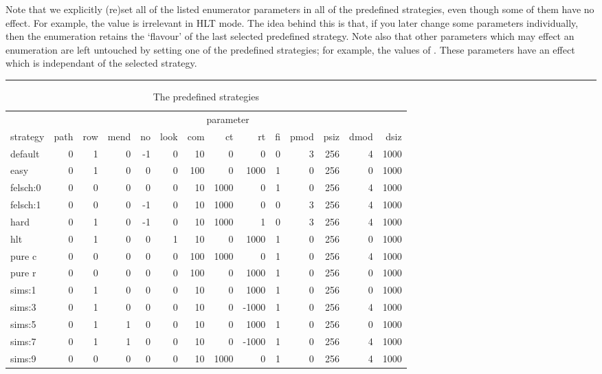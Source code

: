 Note that we explicitly (re)set all of the listed enumerator parameters in
  all of the predefined strategies, even though some of them have no
  effect.
For example, the  value is irrelevant in HLT mode.
The idea behind this is that, if you later change some parameters
  individually, then the enumeration retains the `flavour' of the last
  selected predefined strategy.
Note also that other parameters which may effect an enumeration are left
  untouched by setting one of the predefined strategies; for example, the
  values of  \amp {}.
These parameters have an effect which is independant of the selected 
  strategy.

\begin{table}
\hrule
\caption{The predefined strategies}
\label{tab:pred}
\smallskip
\renewcommand{\arraystretch}{0.875}
\begin{tabular*}{\textwidth}{@{\extracolsep{\fill}}lrrrrrrrrrrrrr} 
\hline\hline
          & \multicolumn{13}{c}{parameter} \\ 
\cline{2-14}
strategy & path & row & mend & no & look & com & ct   & rt    & fi & pmod & psiz & dmod & dsiz \\ 
\hline
default& 0   & 1   & 0    & -1 & 0    & 10  & 0    & 0     & 0  & 3    & 256  & 4    & 1000 \\
easy   & 0   & 1   & 0    & 0  & 0    & 100 & 0    & 1000  & 1  & 0    & 256  & 0    & 1000 \\
felsch:0& 0   & 0   & 0    & 0  & 0    & 10  & 1000 & 0     & 1  & 0    & 256  & 4    & 1000 \\
felsch:1& 0   & 0   & 0    & -1 & 0    & 10  & 1000 & 0     & 0  & 3    & 256  & 4    & 1000 \\
hard   & 0   & 1   & 0    & -1 & 0    & 10  & 1000 & 1     & 0  & 3    & 256  & 4    & 1000 \\
hlt    & 0   & 1   & 0    & 0  & 1    & 10  & 0    & 1000  & 1  & 0    & 256  & 0    & 1000 \\
pure c & 0   & 0   & 0    & 0  & 0    & 100 & 1000 & 0     & 1  & 0    & 256  & 4    & 1000 \\
pure r & 0   & 0   & 0    & 0  & 0    & 100 & 0    & 1000  & 1  & 0    & 256  & 0    & 1000 \\
sims:1 & 0   & 1   & 0    & 0  & 0    & 10  & 0    & 1000  & 1  & 0    & 256  & 0    & 1000 \\
sims:3 & 0   & 1   & 0    & 0  & 0    & 10  & 0    & -1000 & 1  & 0    & 256  & 4    & 1000 \\
sims:5 & 0   & 1   & 1    & 0  & 0    & 10  & 0    & 1000  & 1  & 0    & 256  & 0    & 1000 \\
sims:7 & 0   & 1   & 1    & 0  & 0    & 10  & 0    & -1000 & 1  & 0    & 256  & 4    & 1000 \\
sims:9 & 0   & 0   & 0    & 0  & 0    & 10  & 1000 & 0     & 1  & 0    & 256  & 4    & 1000 \\
\hline\hline
\end{tabular*}
\end{table}

